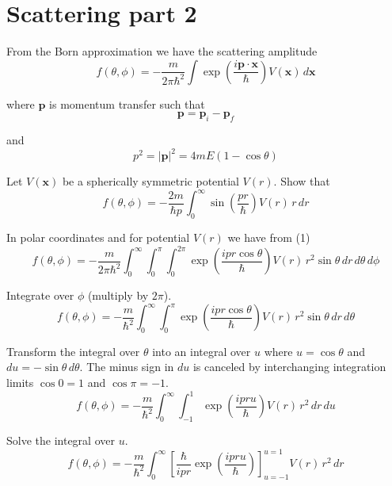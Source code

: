 

\section*{Scattering part 2}

From the Born approximation we have the scattering amplitude
\begin{equation*}
f(\theta,\phi)=-\frac{m}{2\pi\hbar^2}\int
\exp\left(\frac{i\mathbf p\cdot\mathbf x}{\hbar}\right)V(\mathbf x)\,d\mathbf x
\tag{1}
\end{equation*}

where $\mathbf p$ is momentum transfer such that
\begin{equation*}
\mathbf p=\mathbf p_i-\mathbf p_f
\end{equation*}

and
\begin{equation*}
p^2=|\mathbf p|^2=4mE(1-\cos\theta)
\end{equation*}

Let $V(\mathbf x)$ be a spherically symmetric potential $V(r)$.
Show that
\begin{equation*}
f(\theta,\phi)=-\frac{2m}{\hbar p}\int_0^\infty\sin\left(\frac{pr}{\hbar}\right)V(r)\,r\,dr
\end{equation*}

In polar coordinates and for potential $V(r)$ we have from (1)
\begin{equation*}
f(\theta,\phi)
=-\frac{m}{2\pi\hbar^2}
\int_0^\infty
\int_0^\pi
\int_0^{2\pi}
\exp\left(\frac{ipr\cos\theta}{\hbar}\right)V(r)
\,r^2\sin\theta\,dr\,d\theta\,d\phi
\end{equation*}

Integrate over $\phi$ (multiply by $2\pi$).
\begin{equation*}
f(\theta,\phi)
=-\frac{m}{\hbar^2}
\int_0^\infty
\int_0^\pi
\exp\left(\frac{ipr\cos\theta}{\hbar}\right)V(r)\,
r^2\sin\theta\,dr\,d\theta
\end{equation*}

Transform the integral over $\theta$ into an integral over $u$
where $u=\cos\theta$ and $du=-\sin\theta\,d\theta$.
The minus sign in $du$ is canceled by interchanging integration limits
$\cos0=1$ and $\cos\pi=-1$.
\begin{equation*}
f(\theta,\phi)
=-\frac{m}{\hbar^2}
\int_0^\infty
\int_{-1}^1
\exp\left(\frac{ipru}{\hbar}\right)V(r)\,
r^2\,dr\,du
\end{equation*}

Solve the integral over $u$.
\begin{equation*}
f(\theta,\phi)=-\frac{m}{\hbar^2}
\int_0^\infty
\left[\frac{\hbar}{ipr}\exp\left(\frac{ipru}{\hbar}\right)\right]_{u=-1}^{u=1}
V(r)\,r^2\,dr
\end{equation*}


